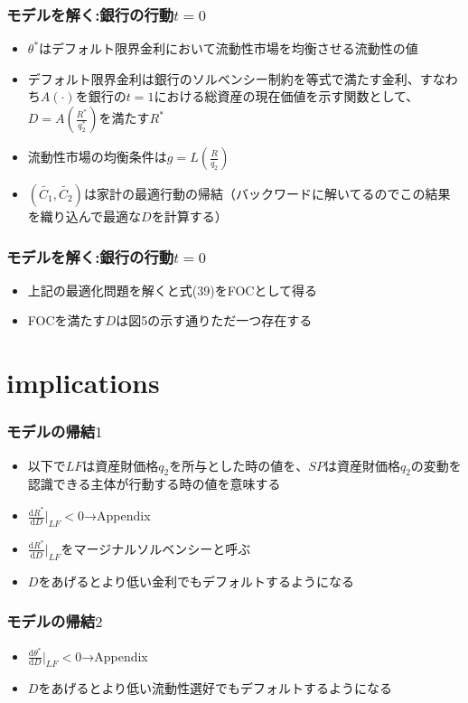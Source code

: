 \documentclass[dvipdfmx, 12pt]{beamer}
\begin{document}
\begin{frame}\frametitle{モデルを解く:銀行の行動$t = 0$}
	\begin{itemize}
		\item $\theta^*$はデフォルト限界金利において流動性市場を均衡させる流動性の値
		\item デフォルト限界金利は銀行のソルベンシー制約を等式で満たす金利、すなわち$A(\cdot)$を銀行の$t=1$における総資産の現在価値を示す関数として、$D = A\left( \frac{R^*}{q_2^*} \right)$を満たす$R^*$
		\item 流動性市場の均衡条件は$g = L\left(\frac{R}{q_2}\right)$
		\item $(\tilde{C_1}, \tilde{C_2})$は家計の最適行動の帰結（バックワードに解いてるのでこの結果を織り込んで最適な$D$を計算する）
	\end{itemize}
\end{frame}

\begin{frame}\frametitle{モデルを解く:銀行の行動$t = 0$}
	\begin{itemize}
		\item 上記の最適化問題を解くと式(39)をFOCとして得る
		\item FOCを満たす$D$は図5の示す通りただ一つ存在する
	\end{itemize}
\end{frame}

\section{implications}
\begin{frame}\frametitle{モデルの帰結$1$}
	\begin{itemize}
		\item 以下で$LF$は資産財価格$q_2$を所与とした時の値を、$SP$は資産財価格$q_2$の変動を認識できる主体が行動する時の値を意味する
		\item $\frac{\mathrm{d}R^*}{\mathrm{d}D}|_{LF} < 0$→Appendix
		\item $\frac{\mathrm{d}R^*}{\mathrm{d}D}|_{LF}$をマージナルソルベンシーと呼ぶ
		\item $D$をあげるとより低い金利でもデフォルトするようになる
	\end{itemize}
\end{frame}

\begin{frame}\frametitle{モデルの帰結$2$}
	\begin{itemize}
		\item $\frac{\mathrm{d}\theta^*}{\mathrm{d}D}|_{LF} < 0$→Appendix
		\item $D$をあげるとより低い流動性選好でもデフォルトするようになる
	\end{itemize}
\end{frame}
\end{document}
